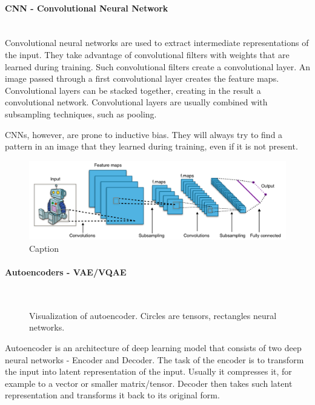 \paragraph{CNN - Convolutional Neural Network}\mbox{}\\

Convolutional neural networks are used to extract intermediate representations of the input. They take advantage of convolutional filters with weights that are learned during training. Such convolutional filters create a convolutional layer. An image passed through a first convolutional layer creates the feature maps. Convolutional layers can be stacked together, creating in the result a convolutional network.
Convolutional layers are usually combined with subsampling techniques, such as pooling. 

CNNs, however, are prone to inductive bias. They will always try to find a pattern in an image that they learned during training, even if it is not present.

\begin{figure}[H]
    \centering
    \includegraphics[width=0.9\linewidth]{concept_engineering/Typical_cnn.png}
    \caption{Caption}
    \label{fig:cnn}
\end{figure}


\paragraph{Autoencoders - VAE/VQAE}\mbox{}\\
\begin{figure}[H]
    \centering
    
    \caption{Visualization of autoencoder. Circles are tensors, rectangles neural networks.}
    \label{fig:autoencoder}
\end{figure}
\indent Autoencoder is an architecture of deep learning model that consists of two deep neural networks - Encoder and Decoder. The task of the encoder is to transform the input into latent representation of the input. Usually it compresses it, for example to a vector or smaller matrix/tensor. Decoder then takes such latent representation and transforms it back to its original form. 


